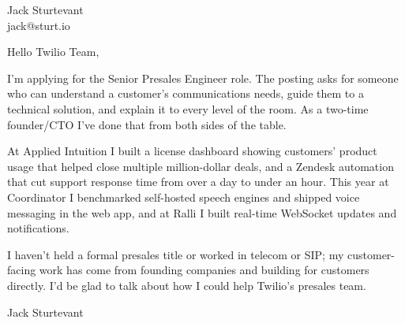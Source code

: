 \documentclass[11pt]{article}
\begin{document}
\raggedright

{\namefont\fontsize{20pt}{24pt}\selectfont Jack Sturtevant}\\[-0.3em]
jack@sturt.io

\vspace{1.2em}

Hello Twilio Team,

I'm applying for the Senior Presales Engineer role. The posting asks for someone who can understand a customer's communications needs, guide them to a technical solution, and explain it to every level of the room. As a two-time founder/CTO I've done that from both sides of the table.

At Applied Intuition I built a license dashboard showing customers' product usage that helped close multiple million-dollar deals, and a Zendesk automation that cut support response time from over a day to under an hour. This year at Coordinator I benchmarked self-hosted speech engines and shipped voice messaging in the web app, and at Ralli I built real-time WebSocket updates and notifications.

I haven't held a formal presales title or worked in telecom or SIP; my customer-facing work has come from founding companies and building for customers directly. I'd be glad to talk about how I could help Twilio's presales team.

\vspace{0.6em}
Jack Sturtevant
\end{document}
